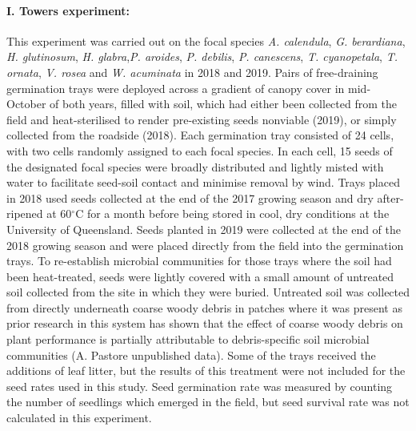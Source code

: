 \begin{refsection}
        \paragraph{I. Towers experiment: }
        This experiment was carried out on the focal species \textit{A. calendula}, \textit{G. berardiana}, \textit{H. glutinosum}, \textit{H. glabra},\textit{P. aroides}, \textit{P. debilis}, \textit{P. canescens}, \textit{T. cyanopetala}, \textit{T. ornata}, \textit{V. rosea} and \textit{W. acuminata} in 2018 and 2019. Pairs of free-draining germination trays were deployed across a gradient of canopy cover in mid-October of both years, filled with soil, which had either been collected from the field and heat-sterilised to render pre-existing seeds nonviable (2019), or simply collected from the roadside (2018). Each germination tray consisted of 24 cells, with two cells randomly assigned to each focal species. In each cell, 15 seeds of the designated focal species were broadly distributed and lightly misted with water to facilitate seed-soil contact and minimise removal by wind. Trays placed in 2018 used seeds collected at the end of the 2017 growing season and dry after-ripened at 60$^{\circ}$C for a month before being stored in cool, dry conditions at the University of Queensland. Seeds planted in 2019 were collected at the end of the 2018 growing season and were placed directly from the field into the germination trays. To re-establish microbial communities for those trays where the soil had been heat-treated, seeds were lightly covered with a small amount of untreated soil collected from the site in which they were buried. Untreated soil was collected from directly underneath coarse woody debris in patches where it was present as prior research in this system has shown that the effect of coarse woody debris on plant performance is partially attributable to debris-specific soil microbial communities (A. Pastore unpublished data). Some of the trays received the additions of leaf litter, but the results of this treatment were not included for the seed rates used in this study. Seed germination rate was measured by counting the number of seedlings which emerged in the field, but seed survival rate was not calculated in this experiment.


        \printbibliography   
\end{refsection}


